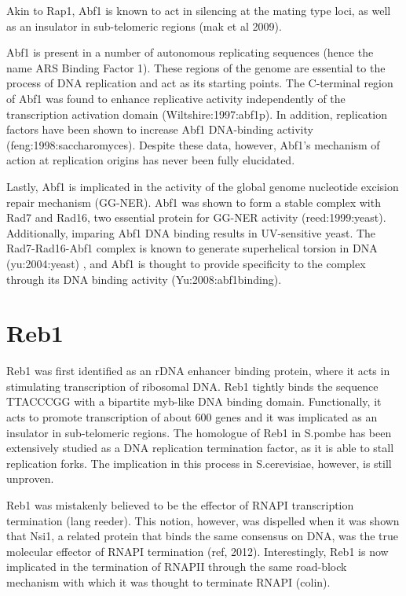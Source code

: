 Akin to Rap1, Abf1 is known to act in silencing at the mating type loci, as well as an insulator in sub-telomeric regions (mak et al 2009). 

Abf1 is present in a number of autonomous replicating sequences (hence the name ARS Binding Factor 1). These regions of the genome are essential to the process of DNA replication and act as its starting points. The C-terminal region of Abf1 was found to enhance replicative activity independently of the transcription activation domain (Wiltshire:1997:abf1p). In addition, replication factors have been shown to increase Abf1 DNA-binding activity (feng:1998:saccharomyces). Despite these data, however, Abf1’s mechanism of action at replication origins has never been fully elucidated.

Lastly, Abf1 is implicated in the activity of the global genome nucleotide excision repair mechanism (GG-NER). Abf1 was shown to form a stable complex with Rad7 and Rad16, two essential protein for GG-NER activity (reed:1999:yeast). Additionally, imparing Abf1 DNA binding results in UV-sensitive yeast. The Rad7-Rad16-Abf1 complex is known to generate superhelical torsion in DNA (yu:2004:yeast) , and Abf1 is thought to provide specificity to the complex through its DNA binding activity (Yu:2008:abf1binding).

\section{Reb1}

Reb1 was first identified as an rDNA enhancer binding protein, where it acts in stimulating transcription of ribosomal DNA. Reb1 tightly binds the sequence TTACCCGG with a bipartite myb-like DNA binding domain. Functionally, it acts to promote transcription of about 600 genes and it was implicated as an insulator in sub-telomeric regions. The homologue of Reb1 in S.pombe has been extensively studied as a DNA replication termination factor, as it is able to stall replication forks. The implication in this process in S.cerevisiae, however, is still unproven.

Reb1 was mistakenly believed to be the effector of RNAPI transcription termination (lang reeder). This notion, however, was dispelled when it was shown that Nsi1, a related protein that binds the same consensus on DNA, was the true molecular effector of RNAPI termination (ref, 2012). Interestingly, Reb1 is now implicated in the termination of RNAPII through the same road-block mechanism with which it was thought to terminate RNAPI (colin).

